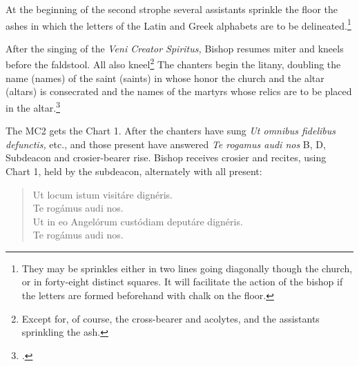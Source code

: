\documentclass[letterpaper]{report}
\begin{document}
{\rubric At the beginning of the second strophe several assistants sprinkle the
floor the ashes in which the letters of the Latin and Greek alphabets are to be
delineated.\footnote{They may be sprinkles either in two lines going diagonally
though the church, or in forty-eight distinct squares. It will facilitate the
action of the bishop if the letters are formed beforehand with chalk on the
floor.}

\rubric After the singing of the \textit{Veni Creator Spiritus,} Bishop resumes
miter and kneels before the faldstool. All also kneel\footnote{Except for, of
course, the cross-bearer and acolytes, and the assistants sprinkling the ash.}
The chanters begin the litany, doubling the name (names) of the saint (saints)
in whose honor the church and the altar (altars) is consecrated and the names
of the martyrs whose relics are to be placed in the altar.\footcite[If the name
of any of these saints is inscried in the litany, e.g., St. Peter, St. Stephen,
it is invoked a second time immediately after the proper invocation in the
Litany. If the name is not in the Litany, it is inserted after the
\textit{individual} invocations of the saints of the same category, but before
the general invocation, e.g., if the church is consecrated in honor of St.
Francis de Sales, his name is inserted twice after \textit{Sancte Nicol\ae} and
before \textit{Omnes sancti Pontifices et Confessores.} If the church or altar
is consecrated in honor of the Blessed Virgin under any title whatever the
invocation \textit{Sancta Maria} is mentioned twice; if in honor of a mystery
of the Life and Passion of Our Lord, the petition \textit{Fili Redemptor mundi
Deus} is repeated.][Note, p. 51.]{consecranda}

\rubric The MC2 gets the Chart 1. After the chanters have sung \textit{Ut
omnibus fidelibus defunctis,} etc., and those present have answered \textit{Te
rogamus audi nos} B, D, Subdeacon and crosier-bearer rise. Bishop receives crosier and
recites, using Chart 1, held by the subdeacon, alternately with all present:

\begin{quote}
    \vbar Ut locum istum visitáre dignéris.\\
    \rbar Te rogámus audi nos.\\
    \vbar Ut in eo Angelórum custódiam deputáre dignéris.\\
    \rbar Te rogámus audi nos.\\
\end{quote}

}
\end{document}
